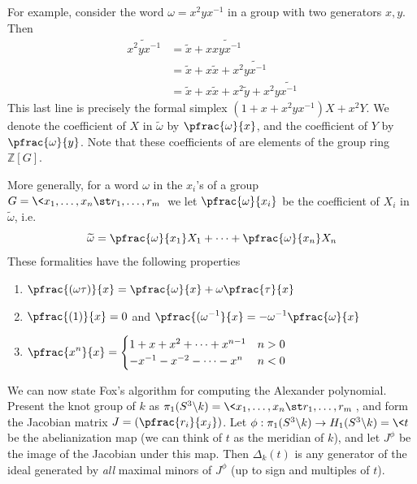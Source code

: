 For example, consider the word $\omega = x^2 y x^{-1}$ in a group with two generators $x,y$. Then
\begin{align*}
	\widetilde{x^2 y x^{-1}} &= \widetilde{x} + x \widetilde{xyx^{-1}} \\
	                         &= \widetilde{x} + x \widetilde{x} + x^2 \widetilde{yx^{-1}} \\
	                         &= \widetilde{x} + x \widetilde{x} + x^2 \widetilde{y} + x^2 y \widetilde{x^{-1}}
\end{align*}
This last line is precisely the formal simplex $(1+x+x^2yx^{-1})X + x^2 Y$. We denote the coefficient of $X$ in $\widetilde{\omega}$ by $\pfrac{\omega}{x}$, and the coefficient of $Y$ by $\pfrac{\omega}{y}$. Note that these coefficients of are elements of the group ring $\mathbb Z[G]$.

More generally, for a word $\omega$ in the $x_i$'s of a group $G = \< x_1,\ldots,x_n \st r_1,\ldots,r_m \>$ we let $\pfrac{\omega}{x_i}$ be the coefficient of $X_i$ in $\widetilde{\omega}$, i.e.
\[ \widetilde{\omega} = \pfrac{\omega}{x_1} X_1 + \cdots + \pfrac{\omega}{x_n} X_n \]
These formalities have the following properties
\begin{enumerate}
	\item $\displaystyle \pfrac{(\omega \tau)}{x} = \pfrac{\omega}{x} + \omega \pfrac{\tau}{x}$
	\item $\displaystyle \pfrac{(1)}{x} = 0$ and $\displaystyle \pfrac{(\omega^{-1}}{x} = -\omega^{-1} \pfrac{\omega}{x}$
	\item $\displaystyle \pfrac{x^n}{x} = \begin{cases} 1+x+x^2+\cdots+x^{n-1} & n>0 \\ -x^{-1}-x^{-2}-\cdots-x^{n} & n < 0 \end{cases}$
\end{enumerate}
We can now state Fox's algorithm for computing the Alexander polynomial. Present the knot group of $k$ as $\pi_1(S^3 \backslash k) = \< x_1,\ldots,x_n \st r_1,\ldots,r_m \>$, and form the Jacobian matrix $J = \left( \pfrac{r_i}{x_j} \right)$. Let $\phi : \pi_1(S^3 \backslash k) \rightarrow H_1(S^3 \backslash k) = \< t \>$ be the abelianization map (we can think of $t$ as the meridian of $k$), and let $J^\phi$ be the image of the Jacobian under this map. Then $\Delta_k(t)$ is any generator of the ideal generated by \emph{all} maximal minors of $J^\phi$ (up to sign and multiples of $t$). 

